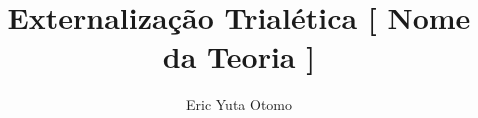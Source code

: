 \documentclass[10pt,a4paper]{report}
\begin{document}
	

	
\title{Externalização Trialética [ Nome da Teoria ]}
\author{Eric Yuta Otomo}
\maketitle

\tableofcontents





\end{document}
